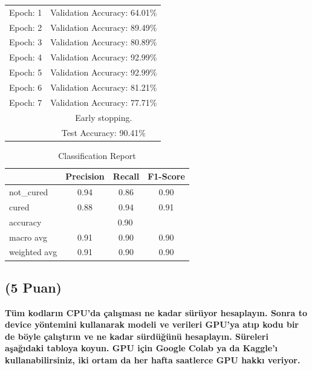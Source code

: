 \documentclass[11pt]{article}
\begin{document}
\begin{minipage}[t]{0.5\textwidth}
    \centering
    \begin{tabular}{cc}
        Epoch: 1 & Validation Accuracy: 64.01\% \\
        Epoch: 2 & Validation Accuracy: 89.49\% \\
        Epoch: 3 & Validation Accuracy: 80.89\% \\
        Epoch: 4 & Validation Accuracy: 92.99\% \\
        Epoch: 5 & Validation Accuracy: 92.99\% \\
        Epoch: 6 & Validation Accuracy: 81.21\% \\
        Epoch: 7 & Validation Accuracy: 77.71\% \\
        & Early stopping. \\
        & Test Accuracy: 90.41\%
    \end{tabular}
\end{minipage}


\begin{table}[h]
    \centering
    \begin{minipage}[t]{0.5\textwidth}
        \centering
        \begin{tabular}{lccc}
            \hline
             & Precision & Recall & F1-Score \\ \hline
            not\_cured & 0.94 & 0.86 & 0.90 \\ \hline
            cured & 0.88 & 0.94 & 0.91 \\ \hline
            accuracy & \multicolumn{3}{c}{0.90} \\ \hline
            macro avg & 0.91 & 0.90 & 0.90 \\ \hline
            weighted avg & 0.91 & 0.90 & 0.90 \\ \hline
        \end{tabular}
        \caption{Classification Report}
        \label{tab:classification_report}
    \end{minipage}
\end{table}
\subsection{(5 Puan)} \textbf{Tüm kodların CPU'da çalışması ne kadar sürüyor hesaplayın. Sonra to device yöntemini kullanarak modeli ve verileri GPU'ya atıp kodu bir de böyle çalıştırın ve ne kadar sürdüğünü hesaplayın. Süreleri aşağıdaki tabloya koyun. GPU için Google Colab ya da Kaggle'ı kullanabilirsiniz, iki ortam da her hafta saatlerce GPU hakkı veriyor.}
\end{document}
